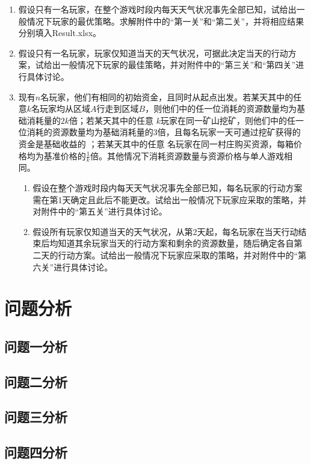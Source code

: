 \documentclass[withoutpre]{cumcmthesis} %
\begin{document}
\begin{enumerate}
    \item 假设只有一名玩家，在整个游戏时段内每天天气状况事先全部已知，试给出一般情况下玩家的最优策略。求解附件中的“第一关”和“第二关”，并将相应结果分别填入Result.xlsx。
    \item 假设只有一名玩家，玩家仅知道当天的天气状况，可据此决定当天的行动方案，试给出一般情况下玩家的最佳策略，并对附件中的“第三关”和“第四关”进行具体讨论。
    \item 现有$n$名玩家，他们有相同的初始资金，且同时从起点出发。若某天其中的任意$k$名玩家均从区域$A$行走到区域$B$，则他们中的任一位消耗的资源数量均为基础消耗量的$2k$倍；若某天其中的任意 $k$玩家在同一矿山挖矿，则他们中的任一位消耗的资源数量均为基础消耗量的3倍，且每名玩家一天可通过挖矿获得的资金是基础收益的 ；若某天其中的任意 名玩家在同一村庄购买资源，每箱价格均为基准价格的$\frac{1}{k}$倍。其他情况下消耗资源数量与资源价格与单人游戏相同。
    \begin{enumerate}
        \item 假设在整个游戏时段内每天天气状况事先全部已知，每名玩家的行动方案需在第1天确定且此后不能更改。试给出一般情况下玩家应采取的策略，并对附件中的“第五关”进行具体讨论。
        \item 假设所有玩家仅知道当天的天气状况，从第2天起，每名玩家在当天行动结束后均知道其余玩家当天的行动方案和剩余的资源数量，随后确定各自第二天的行动方案。试给出一般情况下玩家应采取的策略，并对附件中的“第六关”进行具体讨论。
    \end{enumerate}

\end{enumerate}


\section{问题分析}
\subsection{问题一分析}


\subsection{问题二分析}


\subsection{问题三分析}


\subsection{问题四分析}
\end{document}
